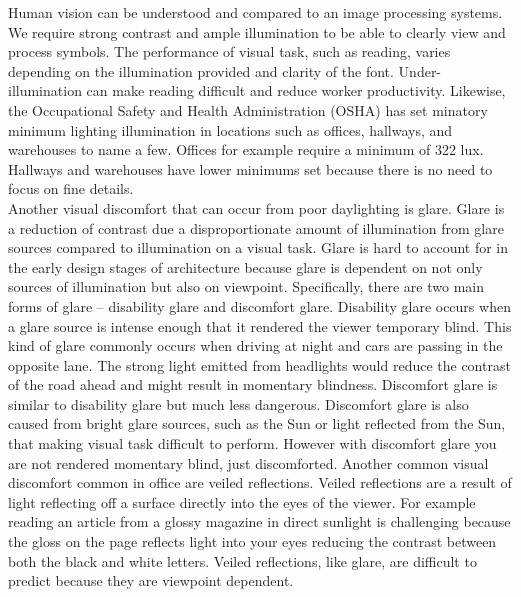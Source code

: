     Human vision can be understood and compared to an image processing systems.
    We require strong contrast and ample illumination to be able to clearly view and process symbols.
    The performance of visual task, such as reading, varies depending on the illumination provided and clarity of the font.
    Under-illumination can make reading difficult and reduce worker productivity\cite{boyce}.
    Likewise, the Occupational Safety and Health Administration (OSHA) has set minatory minimum lighting illumination in locations such as offices, hallways, and warehouses to name a few. 
    Offices for example require a minimum of 322 lux.
    Hallways and warehouses have lower minimums set because there is no need to focus on fine details\cite{OSHA}. \\

    Another visual discomfort that can occur from poor daylighting is glare.
    Glare is a reduction of contrast due a disproportionate amount of illumination from glare sources compared to illumination on a visual task.
    Glare is hard to account for in the early design stages of architecture because glare is dependent on not only sources of illumination but also on viewpoint.
    Specifically, there are two main forms of glare -- disability glare and discomfort glare.\cite{Robbins}
    Disability glare occurs when a glare source is intense enough that it rendered the viewer temporary blind. 
    This kind of glare commonly occurs when driving at night and cars are passing in the opposite lane. 
    The strong light emitted from headlights would reduce the contrast of the road ahead and might result in momentary blindness.
    Discomfort glare is similar to disability glare but much less dangerous. 
    Discomfort glare is also caused from bright glare sources, such as the Sun or light reflected from the Sun, that making visual task difficult to perform. 
    However with discomfort glare you are not rendered momentary blind, just discomforted.
    Another common visual discomfort common in office are veiled reflections.
    Veiled reflections are a result of light reflecting off a surface directly into the eyes of the viewer. 
    For example reading an article from a glossy magazine in direct sunlight is challenging because the gloss on the page reflects light into your eyes reducing the contrast between both the black and white letters. 
    Veiled reflections, like glare, are difficult to predict because they are viewpoint dependent. \\

